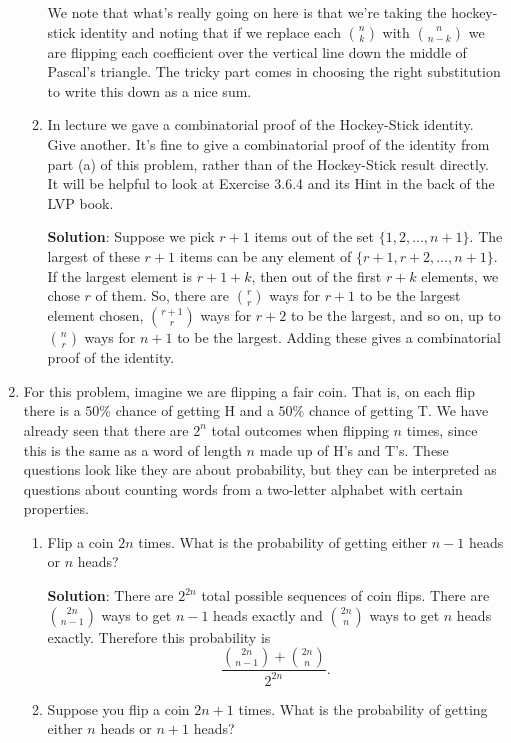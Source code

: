 \documentclass[11pt]{article}
\begin{document}
\begin{enumerate}
\begin{enumerate}
We note that what's really going on here is that we're taking the hockey-stick identity and noting that if we replace each $\binom{n}{k}$ with $\binom{n}{n-k}$ we are flipping each coefficient over the vertical line down the middle of Pascal's triangle.  The tricky part comes in choosing the right substitution to write this down as a nice sum.


\item In lecture we gave a combinatorial proof of the Hockey-Stick identity.  Give another.  It's fine to give a combinatorial proof of the identity from part (a) of this problem, rather than of the Hockey-Stick result directly. It will be helpful to look at Exercise 3.6.4 and its Hint in the back of the LVP book.

{\bf Solution}: Suppose we pick $r+1$ items out of the set $\{1,2,\ldots, n+1\}$.  The largest of these $r+1$ items can be any element of $\{r+1,r+2,\ldots, n+1\}$.  If the largest element is $r+1+k$, then out of the first $r+k$ elements, we chose $r$ of them.  So, there are $\binom{r}{r}$ ways for $r+1$ to be the largest element chosen, $\binom{r+1}{r}$ ways for $r+2$ to be the largest, and so on, up to $\binom{n}{r}$ ways for $n+1$ to be the largest.  Adding these gives a combinatorial proof of the identity.

\end{enumerate}



\item For this problem, imagine we are flipping a fair coin.  That is, on each flip there is a $50\%$ chance of getting H and a $50\%$ chance of getting T.  We have already seen that there are $2^n$ total outcomes when flipping $n$ times, since this is the same as a word of length $n$ made up of H's and T's.  These questions look like they are about probability, but they can be interpreted as questions about counting words from a two-letter alphabet with certain properties.
\begin{enumerate}
\item Flip a coin $2n$ times.  What is the probability of getting either $n-1$ heads or $n$ heads?


{\bf Solution}: There are $2^{2n}$ total possible sequences of coin flips.  There are $\binom{2n}{n-1}$ ways to get $n-1$ heads exactly and $\binom{2n}{n}$ ways to get $n$ heads exactly.  Therefore this probability is
\[
\frac{\binom{2n}{n-1}+\binom{2n}{n}}{2^{2n}}.
\]


\item Suppose you flip a coin $2n+1$ times.  What is the probability of getting either $n$ heads or $n+1$ heads? 


\end{enumerate}
\end{enumerate}
\end{document}
